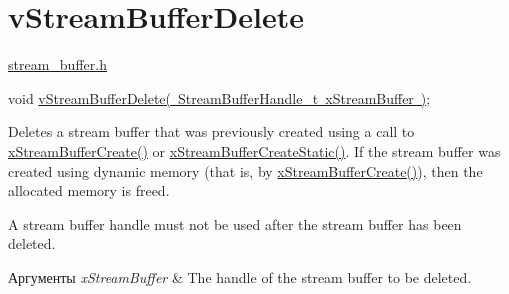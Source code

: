 \hypertarget{group__v_stream_buffer_delete}{}\section{v\+Stream\+Buffer\+Delete}
\label{group__v_stream_buffer_delete}
\mbox{\hyperlink{stream__buffer_8h}{stream\+\_\+buffer.\+h}}


\begin{DoxyPre}
void \mbox{\hyperlink{stream__buffer_8h_a05dc9d2ae220a050526a062eddf6d7a2}{vStreamBufferDelete( StreamBufferHandle\_t xStreamBuffer )}};
\end{DoxyPre}


Deletes a stream buffer that was previously created using a call to \mbox{\hyperlink{stream__buffer_8h_a39aa4dd8b83e2df7ded291f863fb5fed}{x\+Stream\+Buffer\+Create()}} or \mbox{\hyperlink{stream__buffer_8h_a3c248575ac1b83801db605b32a118f77}{x\+Stream\+Buffer\+Create\+Static()}}. If the stream buffer was created using dynamic memory (that is, by \mbox{\hyperlink{stream__buffer_8h_a39aa4dd8b83e2df7ded291f863fb5fed}{x\+Stream\+Buffer\+Create()}}), then the allocated memory is freed.

A stream buffer handle must not be used after the stream buffer has been deleted.


\begin{DoxyParams}{Аргументы}
{\em x\+Stream\+Buffer} & The handle of the stream buffer to be deleted. \\
\hline
\end{DoxyParams}
